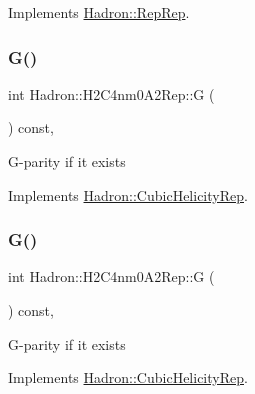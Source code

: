 Implements \mbox{\hyperlink{structHadron_1_1RepRep_a92c8802e5ed7afd7da43ccfd5b7cd92b}{Hadron\+::\+Rep\+Rep}}.

\mbox{\label{structHadron_1_1H2C4nm0A2Rep_a2857fb3aaa46dc918bb0830e875cc3ca}} 
\subsubsection{\texorpdfstring{G()}{G()}\hspace{0.1cm}{\footnotesize\ttfamily [1/3]}}
{\footnotesize\ttfamily int Hadron\+::\+H2\+C4nm0\+A2\+Rep\+::G (\begin{DoxyParamCaption}{ }\end{DoxyParamCaption}) const\hspace{0.3cm}{\ttfamily [inline]}, {\ttfamily [virtual]}}

G-\/parity if it exists 

Implements \mbox{\hyperlink{structHadron_1_1CubicHelicityRep_a50689f42be1e6170aa8cf6ad0597018b}{Hadron\+::\+Cubic\+Helicity\+Rep}}.

\mbox{\label{structHadron_1_1H2C4nm0A2Rep_a2857fb3aaa46dc918bb0830e875cc3ca}} 
\subsubsection{\texorpdfstring{G()}{G()}\hspace{0.1cm}{\footnotesize\ttfamily [2/3]}}
{\footnotesize\ttfamily int Hadron\+::\+H2\+C4nm0\+A2\+Rep\+::G (\begin{DoxyParamCaption}{ }\end{DoxyParamCaption}) const\hspace{0.3cm}{\ttfamily [inline]}, {\ttfamily [virtual]}}

G-\/parity if it exists 

Implements \mbox{\hyperlink{structHadron_1_1CubicHelicityRep_a50689f42be1e6170aa8cf6ad0597018b}{Hadron\+::\+Cubic\+Helicity\+Rep}}.

\mbox{\label{structHadron_1_1H2C4nm0A2Rep_a2857fb3aaa46dc918bb0830e875cc3ca}} 
